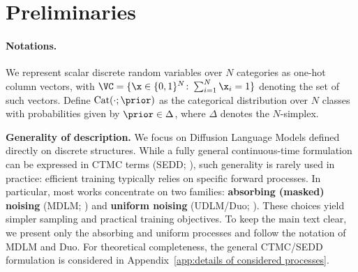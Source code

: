 
\section{Preliminaries}
\paragraph{Notations.}
    We represent scalar discrete random variables over $N$ categories as one-hot column vectors, with ${\VC = \{\x \in \{0,1\}^N\colon \sum_{i=1}^N \x_i = 1\}}$ denoting the set of such vectors. Define $\text{Cat}(\cdot; \prior)$ as the categorical distribution over $N$ classes with probabilities given by $\prior \in \Delta$, where $\Delta$ denotes the $N$-simplex.

\begin{tcolorbox}[colback=gray!20, colframe=gray!20, arc=2mm, boxrule=0pt, width=1\linewidth, boxsep=-1pt]
    \textbf{Generality of description.} We focus on Diffusion Language Models defined directly on discrete structures. While a fully general continuous-time formulation can be expressed in CTMC terms (SEDD; \citealp{lou2024discrete}), such generality is rarely used in practice: efficient training typically relies on specific forward processes. In particular, most works concentrate on two families: \textbf{absorbing (masked) noising} (MDLM; \citealp{sahoo2024simple}) and \textbf{uniform noising} (UDLM/Duo; \citealp{schiff2024discreteguidance, sahoo2025the}). These choices yield simpler sampling and practical training objectives. To keep the main text clear, we present only the absorbing and uniform processes and follow the notation of MDLM and Duo. For theoretical completeness, the general CTMC/SEDD formulation is considered in Appendix~\ref{app:details of considered processes}.
\end{tcolorbox}
    

